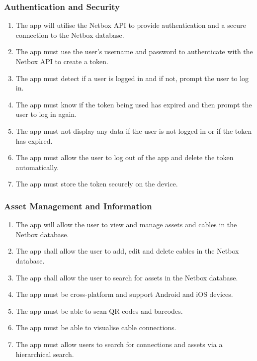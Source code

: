 \documentclass [11pt,a4paper]{article}
\begin{document}
\subsubsection{Authentication and Security}
\label{sec:spec_auth}
\begin{enumerate}[label={\fbox{AUTH\_SPEC\_\arabic*}}, leftmargin=*, labelindent=\parindent]
    \item The app will utilise the Netbox API to provide authentication and a secure connection to the Netbox database.  \label{spec_auth_1}
    \item The app must use the user's username and password to authenticate with the Netbox API to create a token. \label{spec_auth_2}
    \item The app must detect if a user is logged in and if not, prompt the user to log in. \label{spec_auth_3}
    \item The app must know if the token being used has expired and then prompt the user to log in again. \label{spec_auth_4}
    \item The app must not display any data if the user is not logged in or if the token has expired. \label{spec_auth_5}
    \item The app must allow the user to log out of the app and delete the token automatically. \label{spec_auth_6}
    \item The app must store the token securely on the device. \label{spec_auth_7}
\end{enumerate}

\subsubsection{Asset Management and Information}
\label{sec:spec_asset}
\begin{enumerate}[label={\fbox{ASST\_SPEC\_\arabic*}}, leftmargin=*, labelindent=\parindent]
    \item The app will allow the user to view and manage assets and cables in the Netbox database. \label{spec_asset_1}
    \item The app shall allow the user to add, edit and delete cables in the Netbox database. \label{spec_asset_2}
    \item The app shall allow the user to search for assets in the Netbox database. \label{spec_asset_3}
    \item The app must be cross-platform and support Android and iOS devices. \label{spec_asset_4}
    \item The app must be able to scan QR codes and barcodes.  \label{spec_asset_5}
    \item The app must be able to visualise cable connections. \label{spec_asset_6}
    \item The app must allow users to search for connections and assets via a hierarchical search. \label{spec_asset_7}
\end{enumerate}
\end{document}
